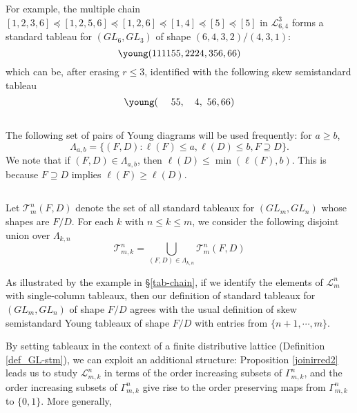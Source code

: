 \documentclass[11pt]{amsart}
\numberwithin{equation}{subsection}
\begin{document}
For example, the multiple chain $[1,2,3,6] \preceq  [1,2,5,6] \preceq  [1,2,6] \preceq  [1,4] \preceq  [5] \preceq  [5]$ in 
$\mathcal{L}_{6,4}^3$ forms a standard tableau for 
$({GL}_{{6}},{GL}_{{3}})$ of shape $(6,4,3,2)/(4,3,1)$:
\begin{equation*}
\young(111155,2224,356,66)
\end{equation*}
which can be, after erasing $r \leq 3$, identified with the following skew semistandard tableau
\begin{equation*}
\young(\ \ \ \ 55,\ \ \ 4,\ 56,66)
\end{equation*}

\medskip

\subsection{}\label{grading_GL}
The following set of pairs of Young diagrams will be used frequently: for 
$a\geq b$,
\begin{equation*}
\Lambda _{a,b}=\{(F,D):\ell (F)\leq a,\ell (D)\leq b,F\supseteq D\}.
\end{equation*}
We note that if $(F,D)\in \Lambda_{a,b}$, then $\ell (D)\leq \min (\ell (F),b)$.
This is because $F\supseteq D$ implies $\ell (F)\geq \ell (D)$.

\medskip

\subsection{}
Let $\mathcal{T}_{m}^{n}(F,D)$ denote the set of all standard tableaux
for $({GL}_{{m}},{GL}_{{n}})$ whose shapes are $F/D$. For each $k$ with 
$n\leq k\leq m$, we consider the following disjoint union over 
$\Lambda_{k,n}$
\begin{equation*}
\mathcal{T}_{m,k}^{n}=\bigcup_{(F,D)\in \Lambda_{k,n}}\mathcal{T}_{m}^{n}(F,D)
\end{equation*}

As illustrated by the example in \S \ref{tab-chain}, if we identify the elements 
of $\mathcal{L}_{m}^{n}$ with single-column
tableaux, then our definition of standard tableaux for $({GL}_{{m}},{GL}_{{n}})$
of shape $F/D$ agrees with the usual definition of skew semistandard Young
tableaux of shape $F/D$ with entries from $\{n+1,\cdots ,m\}$. 

By setting tableaux in the context of a finite distributive lattice (Definition \ref{def_GL-stm}), 
we can exploit an additional structure: Proposition \ref{joinirred2} leads us to study 
$\mathcal{L}_{m, k}^{n}$ in terms of the order increasing subsets of 
$\Gamma _{m, k}^{n}$, and the order increasing subsets of $\Gamma _{m, k}^{n}$ 
give rise to the order preserving maps from $\Gamma _{m, k}^{n}$ to $\{0,1\}$. 
More generally,
\end{document}
